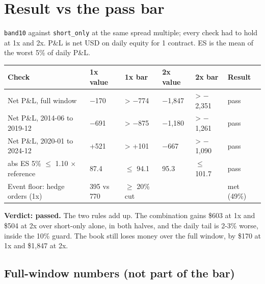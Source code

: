 \documentclass{article}
\begin{document}
\section{Result vs the pass bar}

\texttt{band10} against \texttt{short\_\allowbreak{}only} at the same spread multiple; every check had to hold at 1x and 2x. P\&L is net USD on daily equity for 1 contract. ES is the mean of the worst 5\% of daily P\&L.

\begin{center}\small
\begin{tabularx}{\linewidth}{>{\raggedright\arraybackslash}X l l l l l}
\toprule
\textbf{Check} & \textbf{1x value} & \textbf{1x bar} & \textbf{2x value} & \textbf{2x bar} & \textbf{Result} \\
\midrule
Net P\&L, full window & \ensuremath{-}170 & > \ensuremath{-}774 & \ensuremath{-}1,847 & > \ensuremath{-}2,351 & pass \\
Net P\&L, 2014-06 to 2019-12 & \ensuremath{-}691 & > \ensuremath{-}875 & \ensuremath{-}1,180 & > \ensuremath{-}1,261 & pass \\
Net P\&L, 2020-01 to 2024-12 & +521 & > +101 & \ensuremath{-}667 & > \ensuremath{-}1,090 & pass \\
abs ES 5\% \ensuremath{\leq} 1.10 \ensuremath{\times} reference & 87.4 & \ensuremath{\leq} 94.1 & 95.3 & \ensuremath{\leq} 101.7 & pass \\
Event floor: hedge orders (1x) & 395 vs 770 & \ensuremath{\geq} 20\% cut &  &  & met (49\%) \\
\bottomrule
\end{tabularx}
\end{center}

\textbf{Verdict: passed.} The two rules add up. The combination gains \$603 at 1x and \$504 at 2x over short-only alone, in both halves, and the daily tail is 2-3\% worse, inside the 10\% guard. The book still loses money over the full window, by \$170 at 1x and \$1,847 at 2x.

\subsection{Full-window numbers (not part of the bar)}
\end{document}
